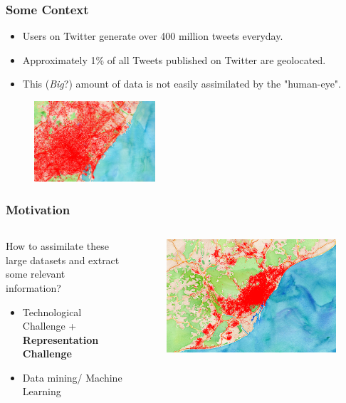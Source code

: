 \documentclass[hyperref={pdfpagelabels=true}]{beamer}
\begin{document}
\begin{frame}
\frametitle{Some Context}
\begin{itemize}    
      \item<1->Users on Twitter generate over 400 million tweets everyday.%
      \item<2->Approximately 1\% of all Tweets published on Twitter are geolocated.
      \item<3->This (\textit{Big}?) amount of data is not easily assimilated by the "human-eye".
\end{itemize}          
  \begin{figure}   
    \includegraphics[width=0.4\textwidth]{bigdata1.png}   
  \end{figure}     
\end{frame}

\begin{frame}
\frametitle{Motivation}
\begin{columns}
  \begin{column}{0.5\textwidth}\small{ 
      How to assimilate these large datasets and extract some relevant information?
      \begin{itemize}    
	    \item<2->Technological Challenge + \textbf{Representation Challenge}
	    \item<3->Data mining/ Machine Learning      
      \end{itemize}                }
  \end{column}
  \begin{column}{0.5\textwidth}      
	\begin{figure}   
	  \includegraphics[width=\textwidth]{bigdata2.png}   
	\end{figure}     
  \end{column}  
\end{columns}
\end{frame}
\end{document}
